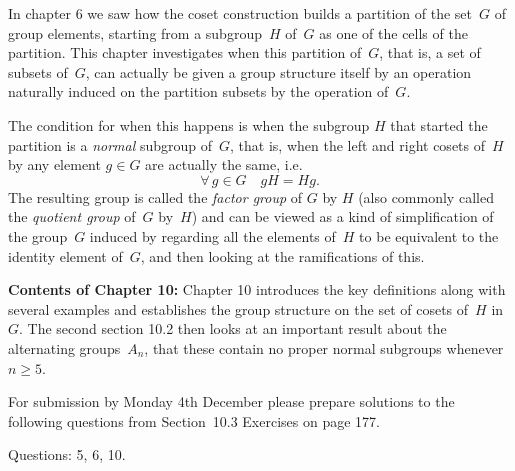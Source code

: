 \documentclass[oneside,10pt]{amsart}
\begin{document}

In chapter 6 we saw how the coset construction builds a partition of the set~$G$ of group elements,
starting from a subgroup~$H$ of~$G$ as one of the cells of the partition. This chapter investigates when
this partition of~$G$, that is, a set of subsets of~$G$, can actually be given a group structure itself by an operation naturally induced on the partition subsets by the operation of~$G$.

The condition for when this happens is when the subgroup $H$ that started the partition is a
\emph{normal} subgroup of~$G$, that is, when the left and right cosets of~$H$ by any element $g \in G$ are actually the same, i.e.
$$ \forall \, g \in G \quad gH = Hg.$$
The resulting group is called the \emph{factor group} of $G$ by $H$ (also commonly called the
\emph{quotient group} of~$G$ by~$H$) and can be viewed as a kind of simplification of the group~$G$
induced by regarding all the elements of~$H$ to be equivalent to the identity element of~$G$, and then looking at the ramifications of this.
\vskip 6pt

\textbf{Contents of Chapter 10:}
Chapter 10 introduces the key definitions along with several examples and establishes the group structure on the set of cosets of~$H$ in~$G$. The second section 10.2 then looks at an important result about the alternating groups~$A_n$, that these contain no proper normal subgroups whenever $n \geq 5$.


For submission by Monday 4th December please prepare solutions to the following questions
from Section~10.3 Exercises on page 177.

Questions: 5, 6, 10.
\end{document}
